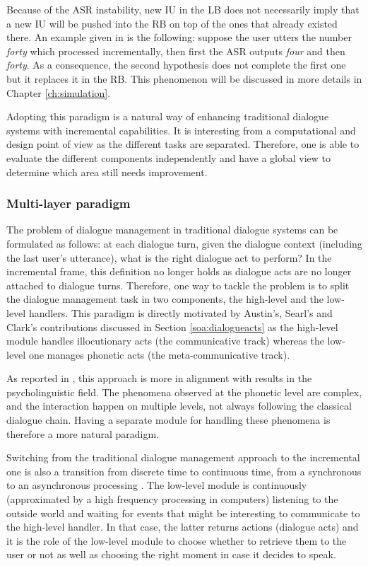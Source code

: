 Because of the ASR instability, new IU in the LB does not necessarily imply that a new IU will be pushed into the RB on top of the ones that already existed there. An example given in \cite{Schlangen2011} is the following: suppose the user utters the number \textit{forty} which processed incrementally, then first the ASR outputs \textit{four} and then \textit{forty}. As a consequence, the second hypothesis does not complete the first one but it replaces it in the RB. This phenomenon will be discussed in more details in Chapter \ref{ch:simulation}.

Adopting this paradigm is a natural way of enhancing traditional dialogue systems with incremental capabilities. It is interesting from a computational and design point of view as the different tasks are separated. Therefore, one is able to evaluate the different components independently \cite{Baumann2011} and have a global view to determine which area still needs improvement.

\subsubsection{Multi-layer paradigm}

The problem of dialogue management in traditional dialogue systems can be formulated as follows: at each dialogue turn, given the dialogue context (including the last user's utterance), what is the right dialogue act to perform? In the incremental frame, this definition no longer holds as dialogue acts are no longer attached to dialogue turns. Therefore, one way to tackle the problem is to split the dialogue management task in two components, the high-level and the low-level handlers. This paradigm is directly motivated by Austin's, Searl's and Clark's contributions discussed in Section \ref{soa:dialogueacts} as the high-level module handles illocutionary acts (the communicative track) whereas the low-level one manages phonetic acts (the meta-communicative track).

As reported in \cite{Lemon2003}, this approach is more in alignment with results in the psycholinguistic field. The phenomena observed at the phonetic level are complex, and the interaction happen on multiple levels, not always following the classical dialogue chain. Having a separate module for handling these phenomena is therefore a more natural paradigm.

Switching from the traditional dialogue management approach to the incremental one is also a transition from discrete time to continuous time, from a synchronous to an asynchronous processing \cite{Raux2007}. The low-level module is continuously (approximated by a high frequency processing in computers) listening to the outside world and waiting for events that might be interesting to communicate to the high-level handler. In that case, the latter returns actions (dialogue acts) and it is the role of the low-level module to choose whether to retrieve them to the user or not as well as choosing the right moment in case it decides to speak.

